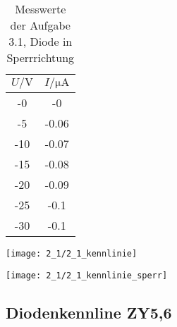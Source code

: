 \documentclass[a4paper, 12pt]{article}
\begin{document}
\begin{table}[H]
  \begin{center}
\begin{tabular}{@{}c|c@{}}
\toprule
$U / \si{\volt}$  & $I / \si{\micro\ampere}$    \\ \midrule
-0  & -0    \\
-5  & -0.06 \\
-10 & -0.07 \\
-15 & -0.08 \\
-20 & -0.09 \\
-25 & -0.1  \\
-30 & -0.1  \\ \bottomrule
\end{tabular}
  \end{center}
\caption{Messwerte der Aufgabe 3.1, Diode in Sperrrichtung}
\end{table}

\begin{center}
 \texttt{[image: 2\_1/2\_1\_kennlinie]}
\end{center}

\begin{center}
 \texttt{[image: 2\_1/2\_1\_kennlinie\_sperr]}
\end{center}

\pagebreak
\subsection{Diodenkennline ZY5,6}
\end{document}
